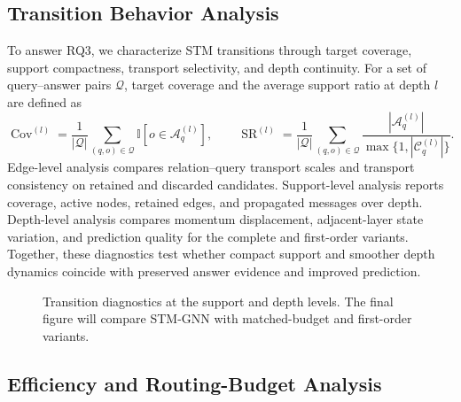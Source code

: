 \documentclass[a4paper,fleqn]{cas-sc}
\begin{document}
\subsection{Transition Behavior Analysis}\label{subsec:transition_analysis}

To answer RQ3, we characterize STM transitions through target coverage, support
compactness, transport selectivity, and depth continuity. For a set of
query--answer pairs $\mathcal{Q}$, target coverage and the average support ratio
at depth $l$ are defined as
\begin{equation}
\operatorname{Cov}^{(l)}
=\frac{1}{|\mathcal{Q}|}\sum_{(q,o)\in\mathcal{Q}}
\mathbb{I}[o\in\mathcal{A}_{q}^{(l)}],
\qquad
\operatorname{SR}^{(l)}
=\frac{1}{|\mathcal{Q}|}\sum_{(q,o)\in\mathcal{Q}}
\frac{|\mathcal{A}_{q}^{(l)}|}
{\max\{1,|\mathcal{C}_{q}^{(l)}|\}}.
\end{equation}
Edge-level analysis compares relation--query transport scales and transport
consistency on retained and discarded candidates. Support-level analysis reports
coverage, active nodes, retained edges, and propagated messages over depth.
Depth-level analysis compares momentum displacement, adjacent-layer state
variation, and prediction quality for the complete and first-order variants.
Together, these diagnostics test whether compact support and smoother depth
dynamics coincide with preserved answer evidence and improved prediction.

\begin{figure}[pos=htbp]
\centering
{}
\caption{Transition diagnostics at the support and depth levels. The final
figure will compare STM-GNN with matched-budget and first-order variants.}
\label{fig:transition_diagnostics}
\end{figure}
\FloatBarrier

\subsection{Efficiency and Routing-Budget Analysis}\label{subsec:efficiency_analysis}
\end{document}
